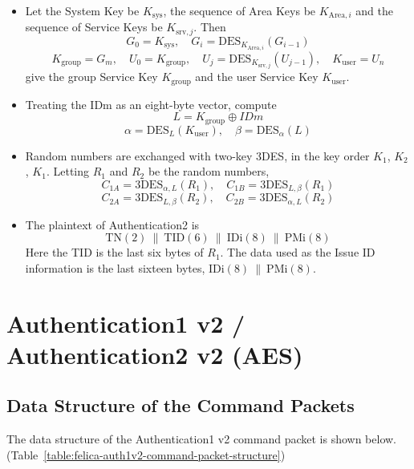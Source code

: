 \documentclass[a4paper,11pt]{report}
\begin{document}
\begin{itemize}
    \item Let the System Key be $K_{\mathrm{sys}}$, the sequence of Area Keys be $K_{\mathrm{Area},i}$ and the sequence of Service Keys be $K_{\mathrm{srv},j}$. Then
          \[
              G_0 = K_{\mathrm{sys}},\quad
              G_i = \mathrm{DES}_{K_{\mathrm{Area},i}}(G_{i-1})
          \]
          \[
              K_{\mathrm{group}} = G_m,\quad
              U_0 = K_{\mathrm{group}},\quad
              U_j = \mathrm{DES}_{K_{\mathrm{srv},j}}(U_{j-1}),\quad
              K_{\mathrm{user}} = U_n
          \]
          give the group Service Key $K_{\mathrm{group}}$ and the user Service Key $K_{\mathrm{user}}$.
    \item Treating the IDm as an eight-byte vector, compute
          \[
              L = K_{\mathrm{group}} \oplus IDm
          \]
          \[
              \alpha = \mathrm{DES}_{L}(K_{\mathrm{user}}),\quad
              \beta  = \mathrm{DES}_{\alpha}(L)
          \]
    \item Random numbers are exchanged with two-key 3DES, in the key order $K_1$, $K_2$, $K_1$. Letting $R_1$ and $R_2$ be the random numbers,
          \[
              C_{1A} = \mathrm{3DES}_{\alpha,L}(R_1),\quad
              C_{1B} = \mathrm{3DES}_{L,\beta}(R_1)
          \]
          \[
              C_{2A} = \mathrm{3DES}_{L,\beta}(R_2),\quad
              C_{2B} = \mathrm{3DES}_{\alpha,L}(R_2)
          \]
    \item The plaintext of Authentication2 is
          \[
              \mathrm{TN}(2)\ \|\ \mathrm{TID}(6)\ \|\ \mathrm{IDi}(8)\ \|\ \mathrm{PMi}(8)
          \]
          Here the TID is the last six bytes of $R_1$. The data used as the Issue ID information is the last sixteen bytes, $\mathrm{IDi}(8)\ \|\ \mathrm{PMi}(8)$.
\end{itemize}

\section[Authentication1 v2 / Authentication2 v2 (AES)]{Authentication1 v2 /\\ Authentication2 v2 (AES)}

\subsection{Data Structure of the Command Packets}

The data structure of the Authentication1 v2 command packet is shown below. (Table~\ref{table:felica-auth1v2-command-packet-structure})
\end{document}
